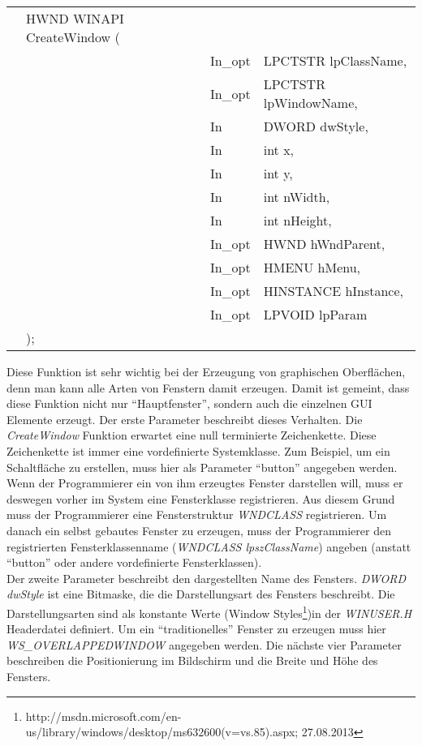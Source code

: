 \begin{tabular}{llll}
&HWND WINAPI CreateWindow (&\\
& & In\_opt & LPCTSTR lpClassName,\\
& & In\_opt & LPCTSTR lpWindowName,\\
& & In      & DWORD dwStyle,\\
& & In      & int x,\\
& & In      & int y,\\
& & In      & int nWidth,\\
& & In      & int nHeight,\\
& & In\_opt & HWND hWndParent,\\
& & In\_opt & HMENU hMenu,\\
& & In\_opt & HINSTANCE hInstance,\\
& & In\_opt & LPVOID lpParam\\
&);
\end{tabular}

Diese Funktion ist sehr wichtig bei der Erzeugung von graphischen Oberflächen, denn man kann alle Arten von Fenstern damit erzeugen. Damit ist gemeint, dass diese Funktion  nicht nur "`Hauptfenster"', sondern auch die einzelnen GUI Elemente erzeugt. Der erste Parameter beschreibt dieses Verhalten. Die \textit{CreateWindow} Funktion erwartet eine null terminierte Zeichenkette. Diese Zeichenkette ist immer eine vordefinierte Systemklasse. Zum Beispiel, um ein Schaltfläche zu erstellen, muss hier als Parameter "`button"' angegeben werden. Wenn der Programmierer ein von ihm erzeugtes Fenster darstellen will, muss er deswegen vorher im System eine Fensterklasse registrieren. Aus diesem Grund muss der Programmierer eine Fensterstruktur \textit{WNDCLASS} registrieren. Um danach ein selbst gebautes Fenster zu erzeugen, muss der Programmierer den registrierten Fensterklassenname (\textit{WNDCLASS lpszClassName}) angeben (anstatt "`button"' oder andere vordefinierte Fensterklassen).\\

Der zweite Parameter beschreibt den dargestellten Name des Fensters. \textit{DWORD dwStyle} ist eine Bitmaske, die die Darstellungsart des Fensters beschreibt. Die Darstellungsarten sind als konstante Werte (Window Styles\footnote{http://msdn.microsoft.com/en-us/library/windows/desktop/ms632600(v=vs.85).aspx; 27.08.2013})in der \textit{WINUSER.H} Headerdatei definiert. Um ein "`traditionelles"' Fenster zu erzeugen muss hier \textit{WS\_OVERLAPPEDWINDOW} angegeben werden. Die nächste vier Parameter beschreiben die Positionierung im Bildschirm und die Breite und Höhe des Fensters.\\ 



